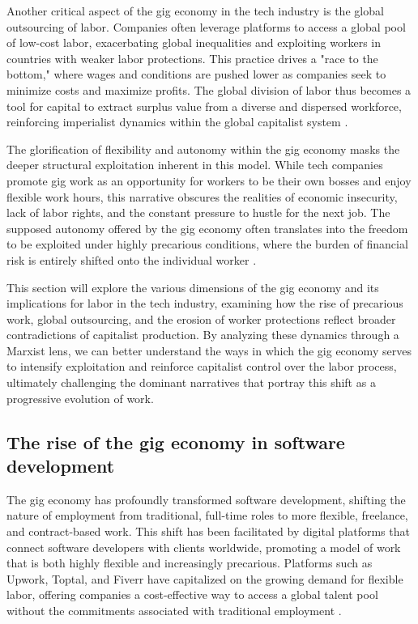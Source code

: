 Another critical aspect of the gig economy in the tech industry is the global outsourcing of labor. Companies often leverage platforms to access a global pool of low-cost labor, exacerbating global inequalities and exploiting workers in countries with weaker labor protections. This practice drives a "race to the bottom," where wages and conditions are pushed lower as companies seek to minimize costs and maximize profits. The global division of labor thus becomes a tool for capital to extract surplus value from a diverse and dispersed workforce, reinforcing imperialist dynamics within the global capitalist system \cite[pp.~87-89]{harvey2003new}.

The glorification of flexibility and autonomy within the gig economy masks the deeper structural exploitation inherent in this model. While tech companies promote gig work as an opportunity for workers to be their own bosses and enjoy flexible work hours, this narrative obscures the realities of economic insecurity, lack of labor rights, and the constant pressure to hustle for the next job. The supposed autonomy offered by the gig economy often translates into the freedom to be exploited under highly precarious conditions, where the burden of financial risk is entirely shifted onto the individual worker \cite[pp.~45-47]{gray2019ghost}.

This section will explore the various dimensions of the gig economy and its implications for labor in the tech industry, examining how the rise of precarious work, global outsourcing, and the erosion of worker protections reflect broader contradictions of capitalist production. By analyzing these dynamics through a Marxist lens, we can better understand the ways in which the gig economy serves to intensify exploitation and reinforce capitalist control over the labor process, ultimately challenging the dominant narratives that portray this shift as a progressive evolution of work.

\subsection{The rise of the gig economy in software development}

The gig economy has profoundly transformed software development, shifting the nature of employment from traditional, full-time roles to more flexible, freelance, and contract-based work. This shift has been facilitated by digital platforms that connect software developers with clients worldwide, promoting a model of work that is both highly flexible and increasingly precarious. Platforms such as Upwork, Toptal, and Fiverr have capitalized on the growing demand for flexible labor, offering companies a cost-effective way to access a global talent pool without the commitments associated with traditional employment \cite[pp.~39-42]{berg2018digital}.

